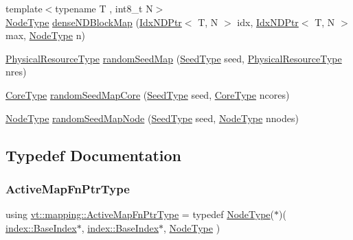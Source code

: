 \begin{DoxyCompactItemize}
\item 
{\footnotesize template$<$typename T , int8\+\_\+t N$>$ }\\\hyperlink{namespacevt_a866da9d0efc19c0a1ce79e9e492f47e2}{Node\+Type} \hyperlink{namespacevt_1_1mapping_a8e5581179e571387304de4b1d19640e7}{dense\+N\+D\+Block\+Map} (\hyperlink{namespacevt_1_1mapping_ab77f5302cd346d499e48a8c796043746}{Idx\+N\+D\+Ptr}$<$ T, N $>$ idx, \hyperlink{namespacevt_1_1mapping_ab77f5302cd346d499e48a8c796043746}{Idx\+N\+D\+Ptr}$<$ T, N $>$ max, \hyperlink{namespacevt_a866da9d0efc19c0a1ce79e9e492f47e2}{Node\+Type} n)
\item 
\hyperlink{namespacevt_a2dc36fcada816dc6d11774d650328ee9}{Physical\+Resource\+Type} \hyperlink{namespacevt_1_1mapping_ab517203040d5d053a2293de5ea58bcf1}{random\+Seed\+Map} (\hyperlink{namespacevt_ae2e13198bdef4d5b8e603d6c1c7f0969}{Seed\+Type} seed, \hyperlink{namespacevt_a2dc36fcada816dc6d11774d650328ee9}{Physical\+Resource\+Type} nres)
\item 
\hyperlink{namespacevt_a74b11b22c02feaabab8591acc87c7c52}{Core\+Type} \hyperlink{namespacevt_1_1mapping_a35fdd9ccfcee759a8c0ba29b5c61d2a5}{random\+Seed\+Map\+Core} (\hyperlink{namespacevt_ae2e13198bdef4d5b8e603d6c1c7f0969}{Seed\+Type} seed, \hyperlink{namespacevt_a74b11b22c02feaabab8591acc87c7c52}{Core\+Type} ncores)
\item 
\hyperlink{namespacevt_a866da9d0efc19c0a1ce79e9e492f47e2}{Node\+Type} \hyperlink{namespacevt_1_1mapping_accca64daff113b58cd733710ab4e0854}{random\+Seed\+Map\+Node} (\hyperlink{namespacevt_ae2e13198bdef4d5b8e603d6c1c7f0969}{Seed\+Type} seed, \hyperlink{namespacevt_a866da9d0efc19c0a1ce79e9e492f47e2}{Node\+Type} nnodes)
\end{DoxyCompactItemize}


\subsection{Typedef Documentation}
\mbox{\label{namespacevt_1_1mapping_a748d5efb71ca5878288d5809f57d7254}} 
\subsubsection{\texorpdfstring{Active\+Map\+Fn\+Ptr\+Type}{ActiveMapFnPtrType}}
{\footnotesize\ttfamily using \hyperlink{namespacevt_1_1mapping_a748d5efb71ca5878288d5809f57d7254}{vt\+::mapping\+::\+Active\+Map\+Fn\+Ptr\+Type} = typedef \hyperlink{namespacevt_a866da9d0efc19c0a1ce79e9e492f47e2}{Node\+Type}($\ast$)( \hyperlink{structvt_1_1index_1_1_base_index}{index\+::\+Base\+Index}$\ast$, \hyperlink{structvt_1_1index_1_1_base_index}{index\+::\+Base\+Index}$\ast$, \hyperlink{namespacevt_a866da9d0efc19c0a1ce79e9e492f47e2}{Node\+Type} )}

